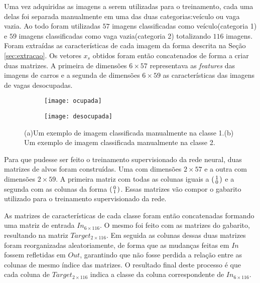 Uma vez adquiridas as imagens a serem utilizadas para o treinamento, cada uma delas foi separada manualmente em uma das duas categorias:veículo ou vaga vazia. Ao todo foram utilizadas $57$ imagens classificadas como veículo(categoria 1) e $59$ imagens classificadas como vaga vazia(categoria 2) totalizando $116$ imagens. Foram extraídas as características de cada imagem da forma descrita na Seção \ref{sec:extracao}. Os vetores $x_s$ obtidos foram então concatenados de forma a criar duas matrizes. A primeira de dimensões $6\times 57$ representava as \textit{features} das imagens de carros e a segunda de dimensões $6\times 59$ as características das imagens de vagas desocupadas.

\begin{figure}
\centering
\begin{subfigure}{.1\textwidth}
  \centering
  \texttt{[image: ocupada]}
  \caption{}
  \label{fig:exemploRede:sub:ocupada}
\end{subfigure}%
\begin{subfigure}{.1\textwidth}
  \centering
  \texttt{[image: desocupada]}
  \caption{}
  \label{fig:exemploRede:sub:desocupada}
\end{subfigure}
\centering
\caption{(a)Um exemplo de imagem classificada manualmente na classe 1.(b) Um exemplo de imagem classificada manualmente na classe 2.}
\label{fig:exemploRede}
\end{figure}

Para que pudesse ser feito o treinamento supervisionado da rede neural, duas matrizes de alvos foram construídas. Uma com dimensões $2\times 57$ e a outra com dimensões $2\times 59$. A primeira matriz com todas as colunas iguais a $\begin{psmallmatrix}1\\0\end{psmallmatrix}$ e a segunda com as colunas da forma $\begin{psmallmatrix}0\\1\end{psmallmatrix}$. Essas matrizes vão compor o gabarito utilizado para o treinamento supervisionado da rede.

As matrizes  de características de cada classe foram então concatenadas formando uma matriz de entrada $In_{6\times 116}$. O mesmo foi feito com as matrizes do gabarito, resultando na matriz $Target_{2\times 116}$. Em seguida as colunas dessas duas matrizes foram reorganizadas aleatoriamente, de forma que as mudanças feitas em $In$ fossem refletidas em $Out$, garantindo que não fosse perdida a relação entre as colunas de mesmo índice das matrizes. O resultado final deste processo é que cada coluna de $Target_{2\times 116}$ indica a classe da coluna correspondente de $In_{6\times 116}$.

